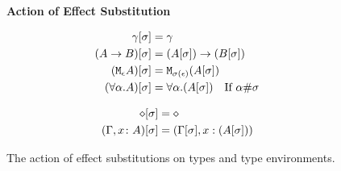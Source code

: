 \documentclass{Report}
\begin{document}
\begin{figure}[H]
    
    \begin{framed}
        \centering
        \textbf{Action of Effect Substitution}

        \begin{minipage}{.47\linewidth}
            
\begin{align*}
    \gamma[\sigma] &= \gamma \\
    (A\rightarrow B)[\sigma] &= (A[\sigma])\rightarrow (B[\sigma]) \\
    (\texttt{M}_{\epsilon}{A})[\sigma] &= \texttt{M}_{\sigma(\epsilon)}{(A[\sigma])}\\
    (\forall \alpha. A)[\sigma] &= \forall \alpha. (A[\sigma])\quad\text{If $\alpha\#\sigma$}
\end{align*}
        \end{minipage}
        \quad
        \begin{minipage}{.47\linewidth}
            \begin{align*}
                \diamond[\sigma] & = \diamond \\
                (\Gamma, x\colon A)[\sigma] &= (\Gamma[\sigma], x:(A[\sigma]))\\
            \end{align*}            
        \end{minipage}
    \end{framed}
    
    \caption{The action of effect substitutions on types and type environments.}
    \label{SubstitutionActionTypesTypeEnvs}
\end{figure}
\end{document}
